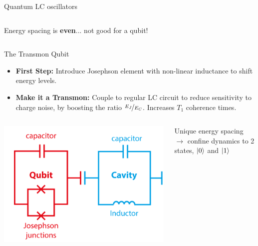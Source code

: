 \begin{frame}{Quantum LC oscillators}
\begin{columns}
  Energy spacing is \textbf{even}... not good for a qubit!
\end{columns}

\end{frame}

\begin{frame}{The Transmon Qubit}
  \begin{itemize}
  \item \textbf{First Step:} Introduce Josephson element with non-linear
inductance to shift energy levels.
  \item \textbf{Make it a Transmon:} Couple to regular LC circuit to reduce
    sensitivity to charge noise, by boosting the ratio $\nicefrac{E_J}{E_C}$.
    Increases $T_1$ coherence times.
  \end{itemize}

  \begin{columns}
    \includegraphics[width=\textwidth]{images/transmon_diagram.png}

    Unique energy spacing $\rightarrow$ confine dynamics to 2 states, $\ket{0}$
    and $\ket{1}$


\end{columns}
\end{frame}

